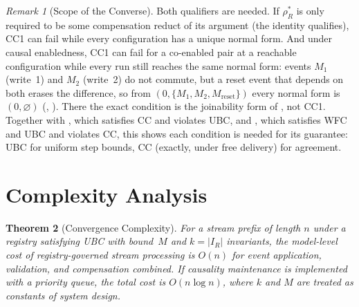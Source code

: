 \documentclass[11pt,a4paper]{article}
\theoremstyle{plain}
\newtheorem{theorem}{Theorem}[section]
\theoremstyle{definition}
\theoremstyle{remark}
\newtheorem{remark}[theorem]{Remark}
\renewcommand{\_}{\textunderscore\allowbreak}
\begin{document}
\begin{remark}[Scope of the Converse]
\label{rem:converse-scope}
Both qualifiers are needed.  If $\rho_R^*$ is only required to be some
compensation reduct of its argument (the identity qualifies), CC1 can fail
while every configuration has a unique normal form.  And under causal
enabledness, CC1 can fail for a co-enabled pair at a reachable configuration
while every run still reaches the same normal form: events $M_1$ (write~1)
and $M_2$ (write~2) do not commute, but a reset event that depends on both
erases the difference, so from $(0, \{M_1, M_2, M_{\mathrm{reset}}\})$ every
normal form is $(0, \varnothing)$ (,
).  There the exact condition is the
joinability form of , not CC1.  Together with
, which satisfies CC and violates UBC, and
, which satisfies WFC and UBC and violates CC, this
shows each condition is needed for its guarantee: UBC for uniform step
bounds, CC (exactly, under free delivery) for agreement.
\end{remark}

\section{Complexity Analysis}
\label{sec:complexity}

\begin{theorem}[Convergence Complexity]
\label{thm:complexity}
For a stream prefix of length $n$ under a registry satisfying UBC with
bound~$M$ and $k = |I_R|$ invariants, the model-level cost of
registry-governed stream processing is $O(n)$ for event application,
validation, and compensation combined.  If causality maintenance is
implemented with a priority queue, the total cost is $O(n \log n)$, where $k$
and $M$ are treated as constants of system design.
\end{theorem}
\end{document}
